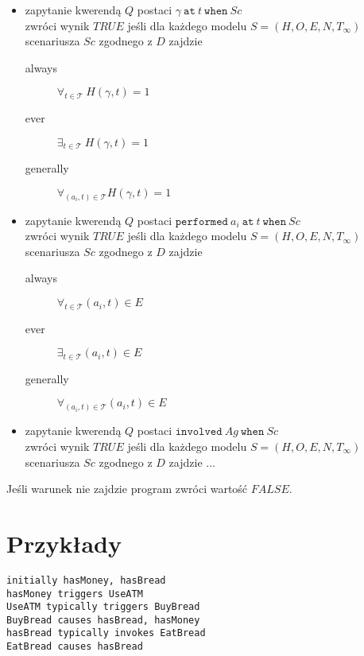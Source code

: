 \begin{itemize}
	\item zapytanie kwerendą $Q$ postaci $\gamma\ \texttt{at}\ t\ \texttt{when}\ Sc$\\ zwróci wynik
	$TRUE$ jeśli dla każdego modelu $S=(H,O,E,N,T_{\infty})$ scenariusza $Sc$ zgodnego z $D$ zajdzie\\
	\begin{description}
		\item[always] $\forall_{t \in \mathcal{T}}\ H(\gamma,t)=1$
		\item[ever] $\exists_{t \in \mathcal{T}}\ H(\gamma,t)=1$
		\item[generally] $\forall_{(a_i,t)\in \mathcal{T}} H(\gamma,t)=1$
	\end{description}
	\item zapytanie kwerendą $Q$ postaci $\texttt{performed}\ a_i\ \texttt{at}\ t\ \texttt{when}\ Sc$\\
	zwróci wynik $TRUE$ jeśli dla każdego modelu $S=(H,O,E,N,T_{\infty})$ scenariusza $Sc$ zgodnego z $D$ zajdzie
	\begin{description}
		\item[always] $\forall_{t \in \mathcal{T}} (a_i,t) \in E$
		\item[ever] $\exists_{t \in \mathcal{T}} (a_i,t) \in E$
		\item[generally] $\forall_{(a_i,t)\in \mathcal{T}} (a_i,t) \in E$
	\end{description}
	\item zapytanie kwerendą $Q$ postaci $\texttt{involved}\ Ag\ \texttt{when}\ Sc$\\ zwróci wynik $TRUE$
	jeśli dla każdego modelu $S=(H,O,E,N,T_{\infty})$ scenariusza $Sc$ zgodnego z $D$ zajdzie ...
\end{itemize}

\begin{remark}
   Jeśli warunek nie zajdzie program zwróci wartość $FALSE$.
\end{remark}
\section{Przykłady}
\begin{example}
	\begin{lstlisting}
initially hasMoney, hasBread
hasMoney triggers UseATM
UseATM typically triggers BuyBread
BuyBread causes hasBread, hasMoney
hasBread typically invokes EatBread
EatBread causes hasBread
	\end{lstlisting}
\end{example}

